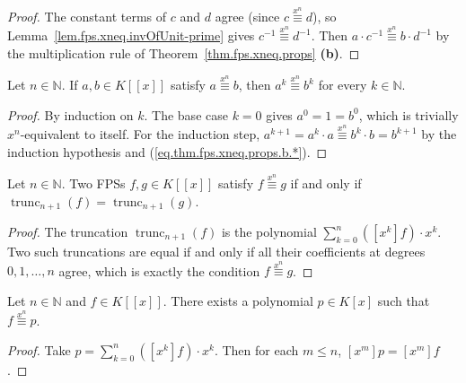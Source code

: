 \begin{proof}
\leanok
The constant terms of $c$ and $d$ agree (since $c\overset{x^{n}}{\equiv}d$),
so Lemma~\ref{lem.fps.xneq.invOfUnit-prime} gives
$c^{-1}\overset{x^{n}}{\equiv}d^{-1}$. Then
$a \cdot c^{-1}\overset{x^{n}}{\equiv}b \cdot d^{-1}$
by the multiplication rule of Theorem~\ref{thm.fps.xneq.props} \textbf{(b)}.
\end{proof}

\begin{lemma}
\label{lem.fps.xneq.pow}
\leanhelper
\leanok
Let $n\in\mathbb{N}$. If $a,b\in K[[x]]$ satisfy $a\overset{x^{n}}{\equiv}b$,
then $a^k\overset{x^{n}}{\equiv}b^k$ for every $k\in\mathbb{N}$.
\end{lemma}

\begin{proof}
\leanok
By induction on $k$. The base case $k=0$ gives $a^0=1=b^0$, which is
trivially $x^n$-equivalent to itself. For the induction step, $a^{k+1}=a^k\cdot a
\overset{x^{n}}{\equiv}b^k\cdot b=b^{k+1}$ by the induction hypothesis and
(\ref{eq.thm.fps.xneq.props.b.*}).
\end{proof}

\begin{lemma}
\label{lem.fps.xneq.trunc}
\leanhelper
\leanok
Let $n\in\mathbb{N}$. Two FPSs $f,g\in K[[x]]$ satisfy $f\overset{x^{n}}{\equiv}g$
if and only if $\operatorname{trunc}_{n+1}(f)=\operatorname{trunc}_{n+1}(g)$.
\end{lemma}

\begin{proof}
\leanok
The truncation $\operatorname{trunc}_{n+1}(f)$ is the polynomial
$\sum_{k=0}^{n}([x^k]f)\cdot x^k$. Two such truncations are equal if and only
if all their coefficients at degrees $0,1,\ldots,n$ agree, which is exactly the
condition $f\overset{x^{n}}{\equiv}g$.
\end{proof}

\begin{lemma}
\label{lem.fps.xneq.exists-poly}
\leanhelper
\leanok
Let $n\in\mathbb{N}$ and $f\in K[[x]]$. There exists a polynomial
$p\in K[x]$ such that $f\overset{x^{n}}{\equiv}p$.
\end{lemma}

\begin{proof}
\leanok
Take $p=\sum_{k=0}^{n}([x^k]f)\cdot x^k$. Then for each $m\leq n$,
$[x^m]p=[x^m]f$.
\end{proof}

